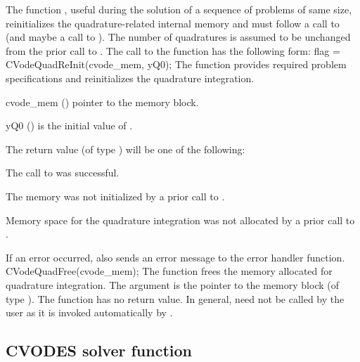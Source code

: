 The function , useful during the solution of a sequence of problems of 
same size, reinitializes the quadrature-related internal memory 
and must follow a call to  (and maybe a call to ). 
The number  of quadratures is assumed to be unchanged from the prior call to 
.
The call to the  function has the following form:
{
  flag = CVodeQuadReInit(cvode\_mem, yQ0);
}
{
  The function  provides required problem specifications 
  and reinitializes the quadrature integration.
}
{
  \begin{args}
  \item[cvode\_mem] ()
    pointer to the {\cvodes} memory block.
  \item[yQ0] ()
    is the initial value of .
  \end{args}
}
{
  The return value  (of type ) will be one of the following:
  \begin{args}
  \item[\Id{CV\_SUCCESS}]
    The call to  was successful.
  \item[\Id{CV\_MEM\_NULL}] 
    The {\cvodes} memory was not initialized by a prior call to .
  \item[\Id{CV\_NO\_QUAD}] 
    Memory space for the quadrature integration was not allocated by a prior
    call to .
  \end{args}
}
{
  If an error occurred,  also sends an error message to the
  error handler function.
}
{
  CVodeQuadFree(cvode\_mem);
}
{
  The function  frees the memory allocated for quadrature integration.
}
{
  The argument is the pointer to the {\cvodes} memory block (of type ).
}
{
  The function  has no return value.
}
{
  In general,  need not be called by the user as it is
  invoked automatically by .
}


\subsection{CVODES solver function}

